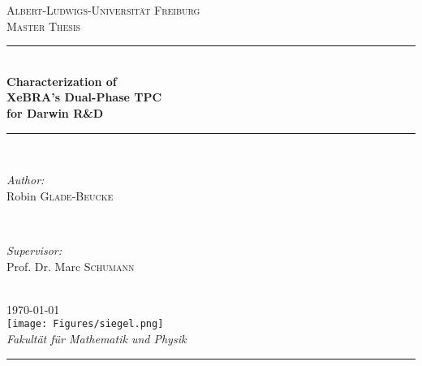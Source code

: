 \begin{titlepage}
\newcommand{\HRule}{\rule{\linewidth}{0.25mm}} %
\center
\textsc{\LARGE Albert-Ludwigs-Universit\"{a}t Freiburg}\\[1.5cm]
\textsc{\Large Master Thesis}\\[0.4cm]
\HRule \\[0.4cm]
\huge \textbf{Characterization of}\\\textbf{Xe\textsc{BRA}'s Dual-Phase TPC}\\\textbf{for Darwin R\&D}
\HRule \\[1.0cm]
\begin{minipage}{0.4\textwidth}
\begin{flushleft} \large
\emph{Author:}\\
Robin \textsc{Glade-Beucke} \\
\end{flushleft}
\end{minipage}
~
\begin{minipage}{0.4\textwidth}
\begin{flushright} \large
\emph{Supervisor:} \\
Prof. Dr. Marc \textsc{Schumann} \\
\end{flushright}
\end{minipage}\\[1cm]

{\large \today}\\[0.8cm]

\texttt{[image: Figures/siegel.png]}\\[1cm]

\large \emph{Fakult\"{a}t f\"{u}r Mathematik und Physik}\\[0.4cm]

\HRule \\
\setcounter{page}{0}
\end{titlepage}
